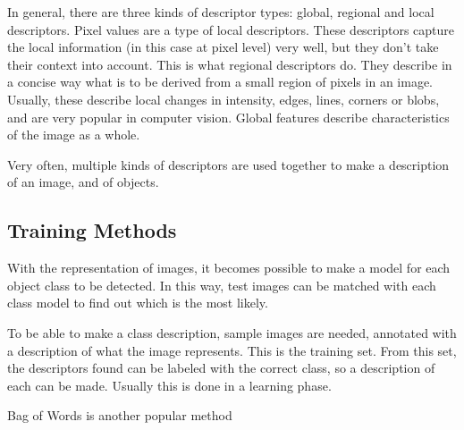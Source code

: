 \documentclass[a4paper,10pt]{article}
\begin{document}
In general, there are three kinds of descriptor types: global, regional and local descriptors. Pixel values are a type of local descriptors. These descriptors capture the local information (in this case at pixel level) very well, but they don't take their context into account. This is what regional descriptors do. They describe in a concise way what is to be derived from a small region of pixels in an image. Usually, these describe local changes in intensity, edges, lines, corners or blobs, and are very popular in computer vision. Global features describe characteristics of the image as a whole. 

Very often, multiple kinds of descriptors are used together to make a description of an image, and of objects.


\subsection{Training Methods} %
\label{sub:training_methods}




With the representation of images, it becomes possible to make a model for each object class to be detected. In this way, test images can be matched with each class model to find out which is the most likely.

To be able to make a class description, sample images are needed, annotated with a description of what the image represents. This is the training set. From this set, the descriptors found can be labeled with the correct class, so a description of each can be made. Usually this is done in a learning phase.


Bag of Words is another popular method \cite{lazebnik2006beyond, van2011exploiting} 

\end{document}
